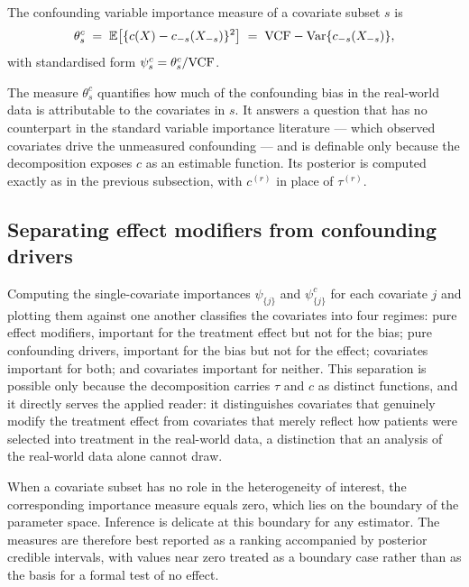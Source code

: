 \begin{definition}
\label{def:cvim}
The confounding variable importance measure of a covariate subset $s$ is
\begin{equation}
\label{eq:cvim}
\theta^{c}_s \;=\; \mathbb{E}\bigl[\{c(X) - c_{-s}(X_{-s})\}^2\bigr]
            \;=\; \mathrm{VCF} - \mathrm{Var}\{c_{-s}(X_{-s})\},
\end{equation}
with standardised form $\psi^{c}_s = \theta^{c}_s / \mathrm{VCF}$.
\end{definition}

\noindent
The measure $\theta^{c}_s$ quantifies how much of the confounding bias in the
real-world data is attributable to the covariates in $s$. It answers a
question that has no counterpart in the standard variable importance literature
--- which observed covariates drive the unmeasured confounding --- and is
definable only because the decomposition exposes $c$ as an estimable function.
Its posterior is computed exactly as in the previous subsection, with $c^{(r)}$
in place of $\tau^{(r)}$.

\subsection{Separating effect modifiers from confounding drivers}
\label{subsec:effmod}

Computing the single-covariate importances $\psi_{\{j\}}$ and $\psi^{c}_{\{j\}}$
for each covariate $j$ and plotting them against one another classifies the
covariates into four regimes: pure effect modifiers, important for the treatment
effect but not for the bias; pure confounding drivers, important for the bias
but not for the effect; covariates important for both; and covariates important
for neither. This separation is possible only because the decomposition carries
$\tau$ and $c$ as distinct functions, and it directly serves the applied reader:
it distinguishes covariates that genuinely modify the treatment effect from
covariates that merely reflect how patients were selected into treatment in the
real-world data, a distinction that an analysis of the real-world data
alone cannot draw.

\begin{remark}
\label{rem:null}
When a covariate subset has no role in the heterogeneity of interest, the
corresponding importance measure equals zero, which lies on the boundary of the
parameter space. Inference is delicate at this boundary for any estimator. The
measures are therefore best reported as a ranking accompanied by posterior
credible intervals, with values near zero treated as a boundary case rather than
as the basis for a formal test of no effect.
\end{remark}

